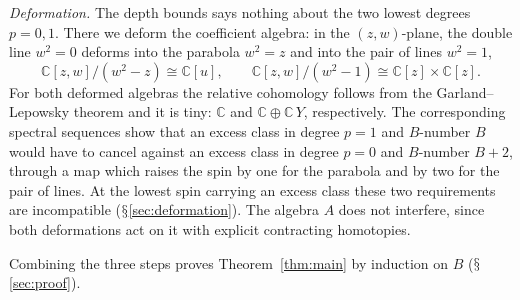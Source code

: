 \documentclass[11pt]{amsart}
\numberwithin{equation}{section}
\renewcommand{\S}{\mbox{$\mathsection$}}
\theoremstyle{definition}
\theoremstyle{remark}
\newcommand{\C}{\mathbb{C}}
\begin{document}
\noindent\emph{Deformation.}
The depth bounds says nothing about the two lowest degrees $p=0,1$. There we deform the coefficient algebra: in the $(z,w)$-plane, the double line $w^2=0$ deforms into the parabola $w^2=z$ and into the pair of lines $w^2=1$,
\begin{equation}\label{eq:intro-deform}
\C[z,w]/(w^2-z)\cong\C[u],\qquad\C[z,w]/(w^2-1)\cong\C[z]\times\C[z].
\end{equation}
For both deformed algebras the relative cohomology follows from the Garland--Lepowsky theorem and it is tiny:  $\C$ and $\C\oplus\C\,Y$, respectively. The corresponding spectral sequences show that an excess class in degree $p=1$ and $B$-number $B$ would have to cancel against an excess class in degree $p=0$ and $B$-number $B+2$, through a map which raises the spin by one for the parabola and by two for the pair of lines. At the lowest spin carrying an excess class these two requirements are incompatible (\S\ref{sec:deformation}). The algebra $A$ does not interfere, since both deformations act on it with explicit contracting homotopies.

Combining the three steps proves Theorem~\ref{thm:main} by induction on $B$ (\S\ref{sec:proof}).
\end{document}
